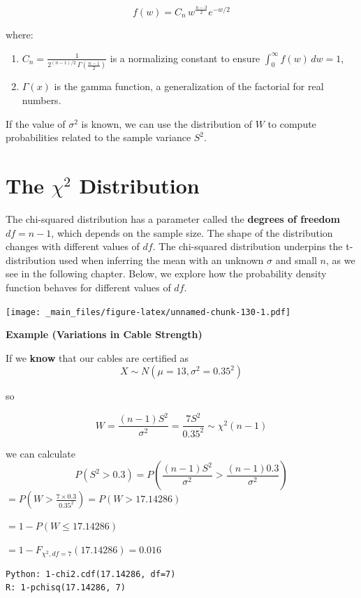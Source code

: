 \documentclass[
]{book}
\providecommand{\tightlist}{%
  \setlength{\itemsep}{0pt}\setlength{\parskip}{0pt}}
\begin{document}
\[
f(w) = C_n \, w^{\frac{n - 3}{2}} e^{-w/2}
\]

where:

\begin{enumerate}
\def\labelenumi{\arabic{enumi}.}
\tightlist
\item
  \(C_n = \frac{1}{2^{(n-1)/2} \, \Gamma\left(\frac{n - 1}{2}\right)}\) is a normalizing constant to ensure \(\int_0^\infty f(w) \, dw = 1\),
\item
  \(\Gamma(x)\) is the gamma function, a generalization of the factorial for real numbers.
\end{enumerate}

If the value of \(\sigma^2\) is known, we can use the distribution of \(W\) to compute probabilities related to the sample variance \(S^2\).

\hypertarget{the-chi2-distribution}{%
\section{\texorpdfstring{The \(\chi^2\) Distribution}{The \textbackslash chi\^{}2 Distribution}}\label{the-chi2-distribution}}

The chi-squared distribution has a parameter called the \textbf{degrees of freedom} \(df = n - 1\), which depends on the sample size. The shape of the distribution changes with different values of \(df\). The chi-squared distribution underpins the t-distribution used when inferring the mean with an unknown \(\sigma\) and small \(n\), as we see in the following chapter. Below, we explore how the probability density function behaves for different values of \(df\).

\texttt{[image: \_main\_files/figure-latex/unnamed-chunk-130-1.pdf]}

\textbf{Example (Variations in Cable Strength)}

If we \textbf{know} that our cables are certified as
\[X \sim N(\mu=13, \sigma^2=0.35^2)\]

so

\[W=\frac{(n-1)S^2}{\sigma^2}= \frac{7S^2}{0.35^2} \sim \chi^2(n-1)\]

we can calculate \[P(S^2 > 0.3)=P(\frac{(n-1)S^2}{\sigma^2} > \frac{(n-1)0.3}{\sigma^2 } )\]
\(=P(W > \frac{7\times0.3}{0.35^2})=P(W > 17.14286)\)

\(=1-P(W \leq 17.14286)\)

\(= 1- F_{\chi^2,df=7}(17.14286)=0.016\)

\begin{verbatim}
Python: 1-chi2.cdf(17.14286, df=7)
R: 1-pchisq(17.14286, 7)
\end{verbatim}
\end{document}
